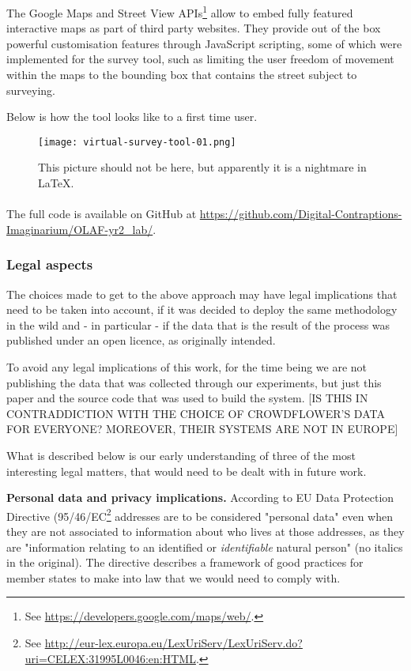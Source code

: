         The Google Maps and Street View APIs\footnote{See \url{https://developers.google.com/maps/web/}.} allow to embed fully featured interactive maps as part of third party websites. They provide out of the box powerful customisation features through JavaScript scripting, some of which were implemented for the survey tool, such as limiting the user freedom of movement within the maps to the bounding box that contains the street subject to surveying.   
        
        Below is how the tool looks like to a first time user.
    
        \begin{figure*}
        	\texttt{[image: virtual-survey-tool-01.png]}
        	\caption{This picture should not be here, but apparently it is a nightmare in LaTeX.}
        	\label{fig:some_figure}
        \end{figure*}
        
        \paragraph{}

        The full code is available on GitHub at \url{https://github.com/Digital-Contraptions-Imaginarium/OLAF-yr2_lab/}.

    \subsubsection{Legal aspects}

    The choices made to get to the above approach may have legal implications that need to be taken into account, if it was decided to deploy the same methodology in the wild and - in particular - if the data that is the result of the process was published under an open licence, as originally intended. 
    
    To avoid any legal implications of this work, for the time being we are not publishing the data that was collected through our experiments, but just this paper and the source code that was used to build the system. [IS THIS IN CONTRADDICTION WITH THE CHOICE OF CROWDFLOWER'S DATA FOR EVERYONE? MOREOVER, THEIR SYSTEMS ARE NOT IN EUROPE]
    
    What is described below is our early understanding of three of the most interesting legal matters, that would need to be dealt with in future work. 

    \textbf{Personal data and privacy implications.} According to EU Data Protection Directive (95/46/EC\footnote{See \url{http://eur-lex.europa.eu/LexUriServ/LexUriServ.do?uri=CELEX:31995L0046:en:HTML}.} addresses are to be considered "personal data" even when they are not associated to information about who lives at those addresses, as they are "information relating to an identified or {\it identifiable} natural person" (no italics in the original). The directive describes a framework of good practices for member states to make into law that we would need to comply with.
    	
